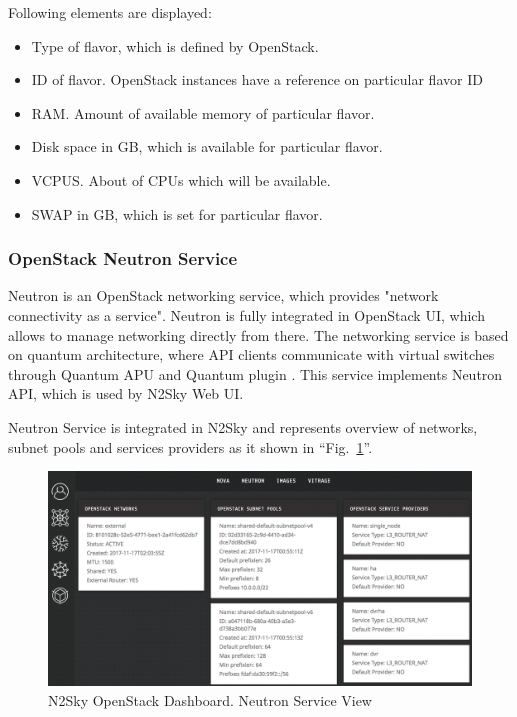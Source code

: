 \begin{description}
Following elements are displayed: 
\begin{itemize}
\item Type of flavor, which is defined by OpenStack.
\item ID of flavor. OpenStack instances have a reference on particular flavor ID
\item RAM. Amount of available memory of particular flavor. 
\item Disk space in GB, which is available for particular flavor. 
\item VCPUS. About of CPUs which will be available. 
\item SWAP in GB, which is set for particular flavor.
\end{itemize}


\end{description}

\subsubsection{OpenStack Neutron Service}\label{OpenStack Neutron Service}

Neutron is an OpenStack networking service, which provides "network connectivity as a service". Neutron is fully integrated in OpenStack UI, which allows to manage networking directly from there. The networking service is based on quantum architecture, where API clients communicate with virtual switches through Quantum APU and Quantum plugin \cite{neutron}. This service implements Neutron API, which is used by N2Sky Web UI. 

Neutron Service is integrated in N2Sky and represents overview of networks, subnet pools and services providers as it shown in ``Fig.~\ref{fig:openstack_neutron}''.

\begin{figure}[htbp]
\begin{center}
  \includegraphics[width=\linewidth]{components/4/pics/openstack_neutron.png}
  \caption{N2Sky OpenStack Dashboard. Neutron Service View}
  \label{fig:openstack_neutron}
\end{center}
\end{figure}

